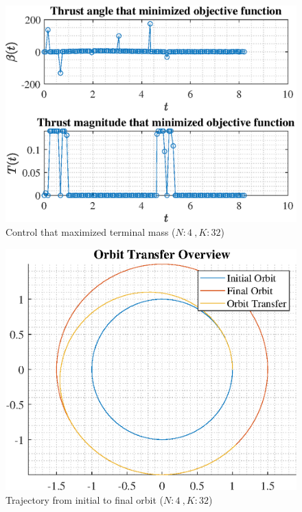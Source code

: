 \documentclass[]{article}
\begin{document}
\begin{figure}
	\centering
	\includegraphics[scale=0.75]{control_N4_K32_C2_mf.eps}
	\caption{Control that maximized terminal mass (\(N:4\ , K:32\))}
	\label{fig:control_N4_K32_C2_mf}
\end{figure}
\begin{figure}
	\centering
	\includegraphics[scale=0.75]{orbit_N4_K32_C2_mf.eps}
	\caption{Trajectory from initial to final orbit (\(N:4\ , K:32\))}
	\label{fig:orbit_N4_K32_C2_mf}
\end{figure}
\end{document}
